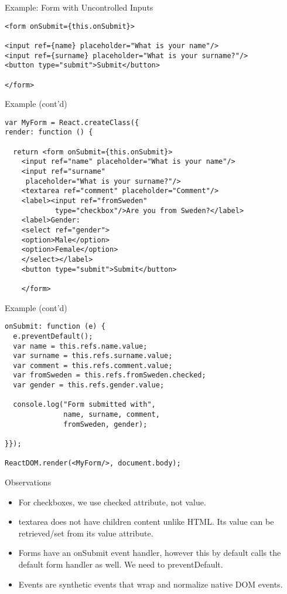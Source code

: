 \documentclass[presentation]{beamer}
\begin{document}
\begin{frame}[fragile,label={sec:orgheadline4}]{Example: Form with Uncontrolled Inputs}
 \begin{verbatim}
<form onSubmit={this.onSubmit}>

<input ref={name} placeholder="What is your name"/>
<input ref={surname} placeholder="What is your surname?"/>
<button type="submit">Submit</button>

</form>
\end{verbatim}
\end{frame}

\begin{frame}[fragile,label={sec:orgheadline5}]{Example (cont'd)}
 \begin{verbatim}
var MyForm = React.createClass({
render: function () {

  return <form onSubmit={this.onSubmit}>
    <input ref="name" placeholder="What is your name"/>
    <input ref="surname"
     placeholder="What is your surname?"/>
    <textarea ref="comment" placeholder="Comment"/>
    <label><input ref="fromSweden"
            type="checkbox"/>Are you from Sweden?</label>
    <label>Gender:
    <select ref="gender">
    <option>Male</option>
    <option>Female</option>
    </select></label>
    <button type="submit">Submit</button>

    </form>
\end{verbatim}
\end{frame}


\begin{frame}[fragile,label={sec:orgheadline6}]{Example (cont'd)}
 \begin{verbatim}
onSubmit: function (e) {
  e.preventDefault();
  var name = this.refs.name.value;
  var surname = this.refs.surname.value;
  var comment = this.refs.comment.value;
  var fromSweden = this.refs.fromSweden.checked;
  var gender = this.refs.gender.value;

  console.log("Form submitted with",
              name, surname, comment,
              fromSweden, gender);

}});

ReactDOM.render(<MyForm/>, document.body);
\end{verbatim}
\end{frame}

\begin{frame}[label={sec:orgheadline7}]{Observations}
\begin{itemize}
\item For checkboxes, we use checked attribute, not value.
\item textarea does not have children content unlike HTML. Its value can be
retrieved/set from its value attribute.
\item Forms have an onSubmit event handler, however this by default calls the
default form handler as well. We need to preventDefault.
\item Events are synthetic events that wrap and normalize native DOM events.
\end{itemize}
\end{frame}
\end{document}
